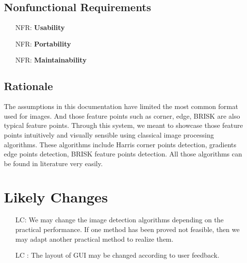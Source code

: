 \documentclass[12pt]{article}
\newcounter{nfrnum} %
\newcounter{lcnum} %
\begin{document}
\subsection{Nonfunctional Requirements}


\noindent \begin{itemize}

\item[NFR\refstepcounter{nfrnum}\thenfrnum \label{NFR_Accuracy}:]
  \textbf{Usability} 

\item[NFR\refstepcounter{nfrnum}\thenfrnum \label{NFR_Usability}:] \textbf{Portability}

\item[NFR\refstepcounter{nfrnum}\thenfrnum \label{NFR_Maintainability}:]
  \textbf{Maintainability} 


\end{itemize}

\subsection{Rationale}

The assumptions in this documentation have limited the most common format used for images. And those feature points such as corner, edge, BRISK are also typical feature points. Through this system, we meant to showcase those feature points intuitively and visually sensible using classical image processing algorithms. These algorithms include Harris corner points detection, gradients edge points detection, BRISK feature points detection. All those algorithms can be found in literature very easily. 

\section{Likely Changes}    

\noindent \begin{itemize}

\item[LC\refstepcounter{lcnum}\thelcnum\label{LC_meaningfulLabel}:] We may change the image detection algorithms depending on the practical performance. If one method has been proved not feasible, then we may adapt another practical method to realize them.
\item [LC\refstepcounter{lcnum}
\thelcnum\label{LC_meaningfulLabel}:] The layout of GUI may be changed according to user feedback.

\end{itemize}
\end{document}
